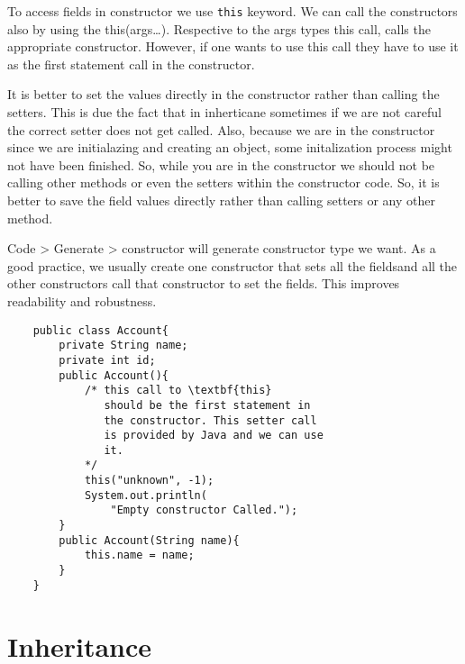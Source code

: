 \documentclass[11pt,twoside,a4paper]{report}
\begin{document}
To access fields in constructor we use \verb|this| keyword.
We can call the constructors also by using the this(args\dots). Respective to the args types this call, calls the appropriate constructor.
However, if one wants to use this call they have to use it as the first statement call in the constructor.

It is better to set the values directly in the constructor rather than calling the setters. 
This is due the fact that in inherticane sometimes if we are not careful the correct setter does not get called.
Also, because we are in the constructor since we are initialazing and creating an object, some initalization process
might not have been finished. So, while you are in the constructor we should not be calling other methods or even the setters within the constructor code.
So, it is better to save the field values directly rather than calling setters or any other method.

Code > Generate > constructor will generate constructor type we want. As a good practice, we usually create one constructor that sets all the fieldsand 
all the other constructors call that constructor to set the fields. This improves readability and robustness.

\begin{lstlisting}
    public class Account{
        private String name;
        private int id;
        public Account(){
            /* this call to \textbf{this}
               should be the first statement in 
               the constructor. This setter call
               is provided by Java and we can use
               it.
            */
            this("unknown", -1);
            System.out.println(
                "Empty constructor Called.");
        }
        public Account(String name){
            this.name = name;
        }
    }
\end{lstlisting}

\section{Inheritance}
\end{document}
